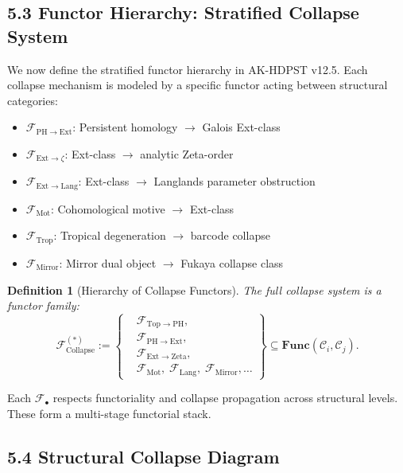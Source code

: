 \documentclass[11pt]{article}
\newtheorem{definition}[theorem]{Definition}
\begin{document}
\subsection{5.3 Functor Hierarchy: Stratified Collapse System}

We now define the stratified functor hierarchy in AK-HDPST v12.5.  
Each collapse mechanism is modeled by a specific functor acting between structural categories:

\begin{itemize}
  \item $\mathcal{F}_{\mathrm{PH} \to \mathrm{Ext}}$: Persistent homology $\to$ Galois Ext-class
  \item $\mathcal{F}_{\mathrm{Ext} \to \zeta}$: Ext-class $\to$ analytic Zeta-order
  \item $\mathcal{F}_{\mathrm{Ext} \to \mathrm{Lang}}$: Ext-class $\to$ Langlands parameter obstruction
  \item $\mathcal{F}_{\mathrm{Mot}}$: Cohomological motive $\to$ Ext-class
  \item $\mathcal{F}_{\mathrm{Trop}}$: Tropical degeneration $\to$ barcode collapse
  \item $\mathcal{F}_{\mathrm{Mirror}}$: Mirror dual object $\to$ Fukaya collapse class
\end{itemize}

\begin{definition}[Hierarchy of Collapse Functors]
The full collapse system is a functor family:
\[
\mathcal{F}^{(*)}_{\mathrm{Collapse}} := \left\{
\begin{aligned}
& \mathcal{F}_{\mathrm{Top} \to \mathrm{PH}}, \\
& \mathcal{F}_{\mathrm{PH} \to \mathrm{Ext}}, \\
& \mathcal{F}_{\mathrm{Ext} \to \mathrm{Zeta}}, \\
& \mathcal{F}_{\mathrm{Mot}}, \;
\mathcal{F}_{\mathrm{Lang}}, \;
\mathcal{F}_{\mathrm{Mirror}}, \ldots
\end{aligned}
\right\}
\subseteq \mathbf{Func}(\mathcal{C}_i, \mathcal{C}_j).
\]
\end{definition}

Each $\mathcal{F}_\bullet$ respects functoriality and collapse propagation across structural levels. These form a multi-stage functorial stack.

\subsection{5.4 Structural Collapse Diagram}
\end{document}
